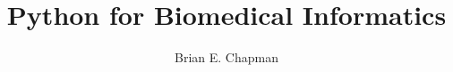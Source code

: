 \documentclass[10pt]{book}
\title{Python for Biomedical Informatics}
\author{Brian E. Chapman}
\newif\ifplastex
\begin{document}
\frontmatter

\ifplastex
    \usepackage{localdef}
    \maketitle

\newcount\anchorcnt
\newcommand*{\Anchor}[1]{%
  \@bsphack%
    \Hy@GlobalStepCount\anchorcnt%
    \edef\@currentHref{anchor.\the\anchorcnt}%
    \Hy@raisedlink{\hyper@anchorstart{\@currentHref}\hyper@anchorend}%
    \M@gettitle{}\label{#1}%
    \@esphack%
}


\else

\newtheorem{exercise}{Exercise}[chapter]



\end{document}
